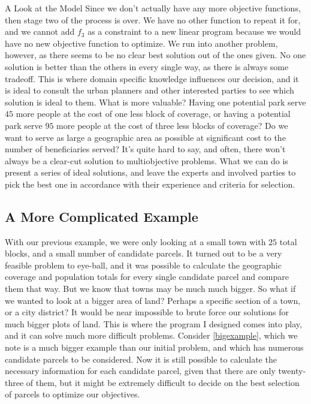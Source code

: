 \documentclass[12pt]{pom_thesis}
\theoremstyle{definition}
\begin{document}
\begin{chapter}{A Look at the Model}
Since we don't actually have any more objective functions, then stage two of the process is over. We have no other function to repeat it for, and we cannot add $f_3$ as a constraint to a new linear program because we would have no new objective function to optimize. We run into another problem, however, as there seems to be no clear best solution out of the ones given. No one solution is better than the others in every single way, as there is always some tradeoff. This is where domain specific knowledge influences our decision, and it is ideal to consult the urban planners and other interested parties to see which solution is ideal to them. What is more valuable? Having one potential park serve $45$ more people at the cost of one less block of coverage, or having a potential park serve $95$ more people at the cost of three less blocks of coverage? Do we want to serve as large a geographic area as possible at significant cost to the number of beneficiaries served? It's quite hard to say, and often, there won't always be a clear-cut solution to multiobjective problems. What we can do is present a series of ideal solutions, and leave the experts and involved parties to pick the best one in accordance with their experience and criteria for selection.
%
%
\subsection{A More Complicated Example} \label{complicated-model}

With our previous example, we were only looking at a small town with $25$ total blocks, and a small number of candidate parcels. It turned out to be a very feasible problem to eye-ball, and it was possible to calculate the geographic coverage and population totals for every single candidate parcel and compare them that way. But we know that towns may be much much bigger. So what if we wanted to look at a bigger area of land? Perhaps a specific section of a town, or a city district? It would be near impossible to brute force our solutions for much bigger plots of land. This is where the program I designed comes into play, and it can solve much more difficult problems. Consider \autoref{bigexample}, which we note is a much bigger example than our initial problem, and which has numerous candidate parcels to be considered. Now it is still possible to calculate the necessary information for each candidate parcel, given that there are only twenty-three of them, but it might be extremely difficult to decide on the best selection of parcels to optimize our objectives. \\


\end{chapter}
\end{document}
